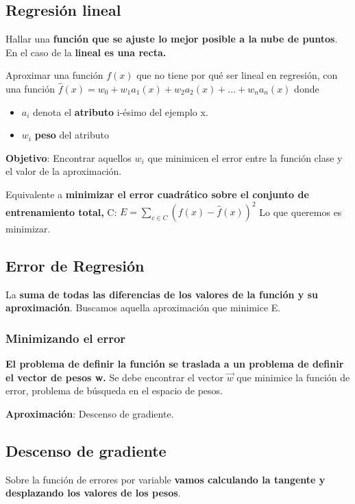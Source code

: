 \documentclass[12pt, twoside, openright]{report} %
\begin{document}
\subsection{Regresión lineal}

Hallar una \textbf{función que se ajuste lo mejor posible a la nube de puntos}. En el caso de la \textbf{lineal es una recta.}

Aproximar una función \(f(x)\) que no tiene por qué ser lineal en regresión, con una función \textbf{\(\hat{f}(x)= w_0 + w_1a_1(x)+ w_2a_2(x)+ ...+ w_na_n(x)\)} donde

\begin{itemize}
	\item \(a_i\) denota el \textbf{atributo} i-ésimo del ejemplo x.
	\item \(w_i\) \textbf{peso} del atributo
\end{itemize}

\textbf{Objetivo}: Encontrar aquellos \(w_i\) que minimicen el error entre la función clase y el valor de la aproximación.

Equivalente a \textbf{minimizar el error cuadrático sobre el conjunto de entrenamiento total, } C: \(E= \sum _{c \in C} (f(x)-\hat{f}(x))^2\) Lo que queremos es minimizar.

\subsection{Error de Regresión}

La \textbf{suma de todas las diferencias de los valores de la función y su aproximación}. Buscamos aquella aproximación que minimice E.

\subsubsection{Minimizando el error}

\textbf{El problema de definir la función se traslada a un problema de definir el vector de pesos w.} Se debe encontrar el vector \(\vec{w}\) que minimice la función de error, problema de búsqueda en el espacio de pesos.

\textbf{Aproximación}: Descenso de gradiente.

\subsection{Descenso de gradiente}
Sobre la función de errores por variable \textbf{vamos calculando la tangente y desplazando los valores de los pesos}.
\end{document}
